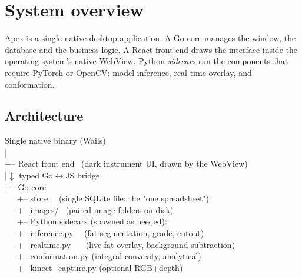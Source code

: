 \chapter{System overview}


\vspace{4pt}
Apex is a single native desktop application. A Go core manages the window, the
database and the business logic. A React front end draws the interface inside the
operating system's native WebView. Python \emph{sidecars} run the components that
require PyTorch or OpenCV: model inference, real-time overlay, and conformation.

\section{Architecture}

\begin{center}
\begin{tcolorbox}[colback=codebg,colframe=hair,boxrule=0.6pt,arc=3pt,width=\linewidth]
\ttfamily\small
Single native binary (Wails)\\
\hspace*{1em}|\\
\hspace*{1em}+-- React front end \ (dark instrument UI, drawn by the WebView)\\
\hspace*{1em}|\hspace*{4em}$\updownarrow$ typed Go$\leftrightarrow$JS bridge\\
\hspace*{1em}+-- Go core\\
\hspace*{2em}\ \ \ +-- store \ \ (single SQLite file: the "one spreadsheet")\\
\hspace*{2em}\ \ \ +-- images/ \ (paired image folders on disk)\\
\hspace*{2em}\ \ \ +-- Python sidecars (spawned as needed):\\
\hspace*{4em}\ \ \ +-- inference.py \ \ (fat segmentation, grade, cutout)\\
\hspace*{4em}\ \ \ +-- realtime.py \ \ \ (live fat overlay, background subtraction)\\
\hspace*{4em}\ \ \ +-- conformation.py (integral convexity, analytical)\\
\hspace*{4em}\ \ \ +-- kinect\_capture.py (optional RGB+depth)
\end{tcolorbox}
\end{center}

